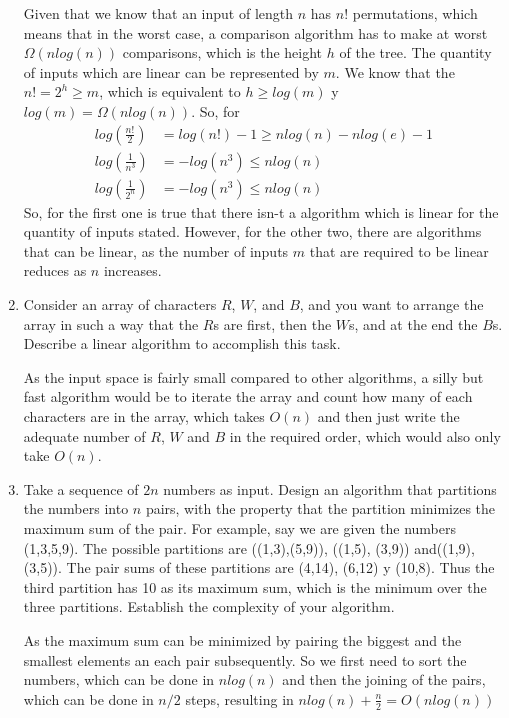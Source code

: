 \documentclass{article}
\begin{document}
\begin{enumerate}
    Given that we know that an input of length $n$ has $n!$ permutations, which means that in the worst case, a comparison algorithm has to make at worst $\Omega(n log(n))$ comparisons, which is the height $h$ of the tree. The quantity of inputs which are linear can be represented by $m$. We know that the $n! = 2^h \geq m$, which is equivalent to $h \geq log(m)$ y $log(m) = \Omega(n log(n))$. So, for
    \begin{align*}
        log(\frac{n!}{2}) &= log(n!) - 1 \geq n log (n) - n log(e) -1\\
        log(\frac{1}{n^3}) &=- log(n^3) \leq n log(n)\\
        log(\frac{1}{2^n}) &=- log(n^3) \leq n log(n)
    \end{align*}
    So, for the first one is true that there isn-t a algorithm which is linear for the quantity of inputs stated. However, for the other two, there are algorithms that can be linear, as the number of inputs $m$ that are required to be linear reduces as $n$ increases.

    \item Consider an array of characters $R$, $W$, and $B$, and you want to arrange the array in such a way that the $R$s are first, then the $W$s, and at the end the $B$s. Describe a linear algorithm to accomplish this task.

    As the input space is fairly small compared to other algorithms, a silly but fast algorithm would be to iterate the array and count how many of each characters are in the array, which takes $O(n)$ and then just write the adequate number of $R$, $W$ and $B$ in the required order, which would also only take $O(n)$.

    \item Take a sequence of $2n$ numbers as input. Design an algorithm that partitions the numbers into $n$ pairs, with the property that the partition minimizes the maximum sum of the pair. For example, say we are given the numbers (1,3,5,9). The possible partitions are ((1,3),(5,9)), ((1,5), (3,9)) and((1,9),(3,5)). The pair sums of these partitions are (4,14), (6,12) y (10,8). Thus the third partition has 10 as its maximum sum, which is the minimum over the three partitions. Establish the complexity of your algorithm.

    As the maximum sum can be minimized by pairing the biggest and the smallest elements an each pair subsequently. So we first need to sort the numbers, which can be done in $n log(n)$ and then the joining of the pairs, which can be done in $n/2$ steps, resulting in $n log(n) + \frac{n}{2} = O(nlog(n))$
\end{enumerate}
\end{document}
